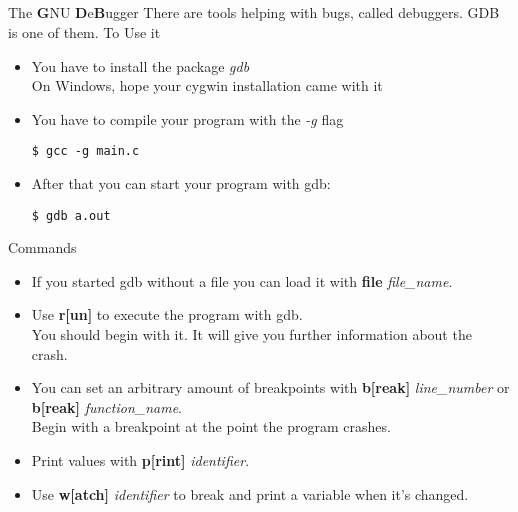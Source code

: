 \subsection{}
\begin{frame}[fragile]{The \textbf{G}NU \textbf{D}e\textbf{B}ugger}
	There are tools helping with bugs, called debuggers. GDB is one of them.
	To Use it
	\begin{itemize}
		\item You have to install the package \textit{gdb}\\
		On Windows, hope your cygwin installation came with it
		\item You have to compile your program with the \textit{-g} flag
		\begin{lstlisting}[numbers=none]
$ gcc -g main.c
\end{lstlisting}
		\item After that you can start your program with gdb:
		\begin{lstlisting}[numbers=none]
$ gdb a.out
\end{lstlisting}
	\end{itemize}
\end{frame}
\begin{frame}{Commands}
	\begin{itemize}
		\item If you started gdb without a file you can load it with \textbf{file} \textit{file\_name}.
		\item Use \textbf{r[un]} to execute the program with gdb.\\
		You should begin with it. It will give you further information about the crash.
		\item You can set an arbitrary amount of breakpoints with \textbf{b[reak]} \textit{line\_number} or \textbf{b[reak]} \textit{function\_name}.\\
		Begin with a breakpoint at the point the program crashes.
		\item Print values with \textbf{p[rint]} \textit{identifier}.
		\item Use \textbf{w[atch]} \textit{identifier} to break and print a variable when it's changed.
	\end{itemize}
\end{frame}
